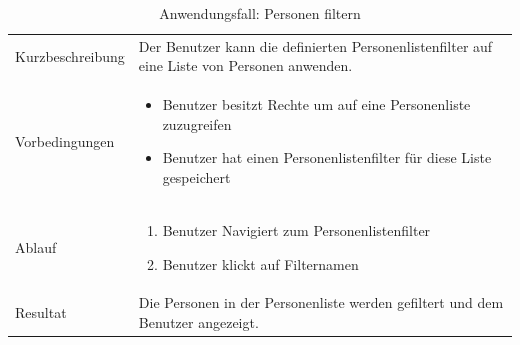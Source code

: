\begin{table}[h!]
   \begin{tabular}{|L{0.3\textwidth}|L{0.6\textwidth}|}
      \hline
        \\[4pt]
      \hline
      Kurzbeschreibung & Der Benutzer kann die definierten Personenlistenfilter auf eine Liste von Personen 
      anwenden. \\
      \hline
      Vorbedingungen & \begin{itemize}
         \item Benutzer besitzt Rechte um auf eine Personenliste zuzugreifen
         \item Benutzer hat einen Personenlistenfilter für diese Liste gespeichert
         \end{itemize}  \\
      \hline
      Ablauf & \begin{enumerate}
      \item Benutzer Navigiert zum Personenlistenfilter
      \item Benutzer klickt auf Filternamen
      \end{enumerate}  \\
      \hline
      Resultat & Die Personen in der Personenliste werden gefiltert und dem Benutzer angezeigt. \\
      \hline
   \end{tabular}
   \caption{Anwendungsfall: Personen filtern}
\end{table}

